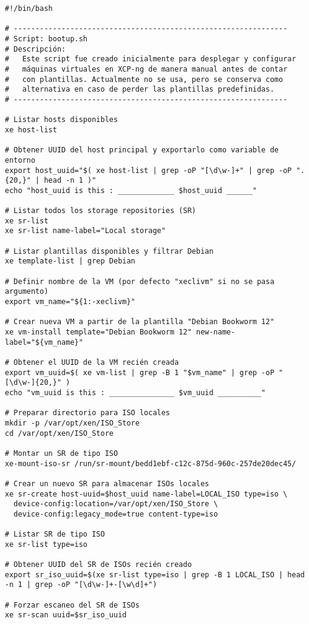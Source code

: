 \begin{verbatim}
#!/bin/bash

# ---------------------------------------------------------------
# Script: bootup.sh
# Descripción:
#   Este script fue creado inicialmente para desplegar y configurar 
#   máquinas virtuales en XCP-ng de manera manual antes de contar 
#   con plantillas. Actualmente no se usa, pero se conserva como 
#   alternativa en caso de perder las plantillas predefinidas.
# ---------------------------------------------------------------

# Listar hosts disponibles
xe host-list

# Obtener UUID del host principal y exportarlo como variable de entorno
export host_uuid="$( xe host-list | grep -oP "[\d\w-]+" | grep -oP ".{20,}" | head -n 1 )"
echo "host_uuid is this : _____________ $host_uuid ______"

# Listar todos los storage repositories (SR)
xe sr-list
xe sr-list name-label="Local storage"

# Listar plantillas disponibles y filtrar Debian
xe template-list | grep Debian

# Definir nombre de la VM (por defecto "xeclivm" si no se pasa argumento)
export vm_name="${1:-xeclivm}"

# Crear nueva VM a partir de la plantilla "Debian Bookworm 12"
xe vm-install template="Debian Bookworm 12" new-name-label="${vm_name}"

# Obtener el UUID de la VM recién creada
export vm_uuid=$( xe vm-list | grep -B 1 "$vm_name" | grep -oP "[\d\w-]{20,}" )
echo "vm_uuid is this : _______________ $vm_uuid __________"

# Preparar directorio para ISO locales
mkdir -p /var/opt/xen/ISO_Store
cd /var/opt/xen/ISO_Store

# Montar un SR de tipo ISO
xe-mount-iso-sr /run/sr-mount/bedd1ebf-c12c-875d-960c-257de20dec45/

# Crear un nuevo SR para almacenar ISOs locales
xe sr-create host-uuid=$host_uuid name-label=LOCAL_ISO type=iso \
  device-config:location=/var/opt/xen/ISO_Store \
  device-config:legacy_mode=true content-type=iso

# Listar SR de tipo ISO
xe sr-list type=iso

# Obtener UUID del SR de ISOs recién creado
export sr_iso_uuid=$(xe sr-list type=iso | grep -B 1 LOCAL_ISO | head -n 1 | grep -oP "[\d\w-]+-[\w\d]+")

# Forzar escaneo del SR de ISOs
xe sr-scan uuid=$sr_iso_uuid


\end{verbatim}
